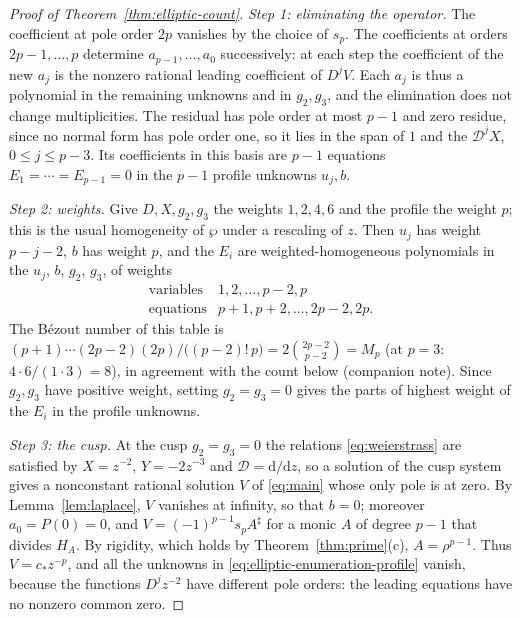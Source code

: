 \begin{proof}[Proof of Theorem~\ref{thm:elliptic-count}]
\emph{Step 1: eliminating the operator.} The coefficient at pole order
\(2p\) vanishes by the choice of \(s_p\). The coefficients at orders
\(2p-1,\ldots,p\) determine \(a_{p-1},\ldots,a_0\) successively: at each
step the coefficient of the new \(a_j\) is the nonzero rational leading
coefficient of \(D^jV\). Each \(a_j\) is thus a polynomial in the
remaining unknowns and in \(g_2,g_3\), and the elimination does not
change multiplicities. The residual has pole order at most \(p-1\) and
zero residue, since no normal form has pole order one, so it lies in the
span of \(1\) and the \(\mathscr D^jX\), \(0\le j\le p-3\). Its
coefficients in this basis are \(p-1\) equations
\(E_1=\cdots=E_{p-1}=0\) in the \(p-1\) profile unknowns \(u_j,b\).

\emph{Step 2: weights.} Give \(D,X,g_2,g_3\) the weights \(1,2,4,6\) and
the profile the weight \(p\); this is the usual homogeneity of \(\wp\)
under a rescaling of \(z\). Then \(u_j\) has weight \(p-j-2\), \(b\) has
weight \(p\), and the \(E_i\) are weighted-homogeneous polynomials in
the \(u_j\), \(b\), \(g_2\), \(g_3\), of weights
\begin{equation}\label{eq:elliptic-weights}
 \begin{array}{c|c}
 \text{variables}&1,2,\ldots,p-2,p\\
 \text{equations}&p+1,p+2,\ldots,2p-2,2p.
 \end{array}
\end{equation}
The B\'ezout number of this table is
\((p+1)\cdots(2p-2)(2p)/\bigl((p-2)!\,p\bigr)=2\binom{2p-2}{p-2}=M_p\)
(at \(p=3\): \(4\cdot6/(1\cdot3)=8\)), in agreement with the count below
(companion note). Since \(g_2,g_3\) have positive weight, setting
\(g_2=g_3=0\) gives the parts of highest weight of the \(E_i\) in the
profile unknowns.

\emph{Step 3: the cusp.} At the cusp \(g_2=g_3=0\) the relations
\eqref{eq:weierstrass} are satisfied by \(X=z^{-2}\), \(Y=-2z^{-3}\) and
\(\mathscr D=\mathrm d/\mathrm dz\), so a solution of the cusp system
gives a nonconstant rational solution \(V\) of \eqref{eq:main} whose
only pole is at zero. By Lemma~\ref{lem:laplace}, \(V\) vanishes at
infinity, so that \(b=0\); moreover \(a_0=P(0)=0\), and
\(V=(-1)^{p-1}s_pA^\sharp\) for a monic \(A\) of degree \(p-1\) that
divides \(H_A\). By rigidity, which holds by Theorem~\ref{thm:prime}(c),
\(A=\rho^{p-1}\). Thus \(V=c_\ast z^{-p}\), and all the unknowns in
\eqref{eq:elliptic-enumeration-profile} vanish, because the functions
\(D^jz^{-2}\) have different pole orders: the leading equations have no
nonzero common zero.


\end{proof}
